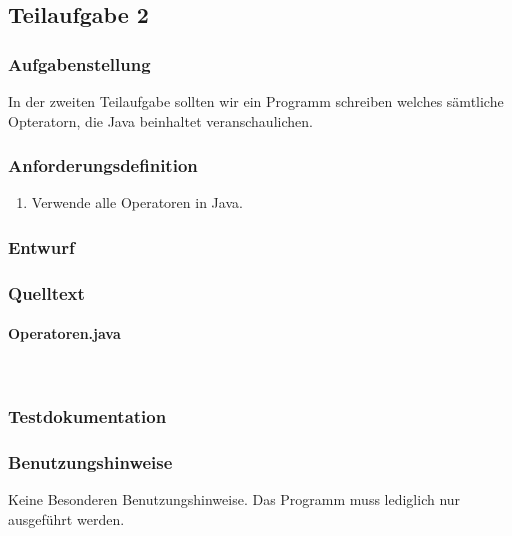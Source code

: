 \subsection{Teilaufgabe 2}
\subsubsection{Aufgabenstellung}
In der zweiten Teilaufgabe sollten wir ein Programm schreiben welches sämtliche Opteratorn,
die Java beinhaltet veranschaulichen.

\subsubsection{Anforderungsdefinition}
\begin{enumerate}
	\item Verwende alle Operatoren in Java.
\end{enumerate}

\subsubsection{Entwurf}


\subsubsection{Quelltext}
\paragraph{Operatoren.java}\


\subsubsection{Testdokumentation}

\subsubsection{Benutzungshinweise}
Keine Besonderen Benutzungshinweise.
Das Programm muss lediglich nur ausgeführt werden.

